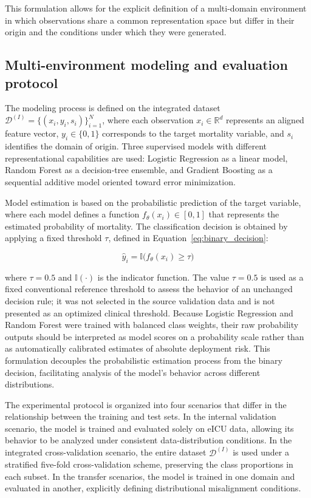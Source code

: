 \documentclass[utf8]{FrontiersinHarvard} %
\begin{document}
This formulation allows for the explicit definition of a multi-domain environment in which observations share a common representation space but differ in their origin and the conditions under which they were generated.

\subsection{Multi-environment modeling and evaluation protocol}

The modeling process is defined on the integrated dataset
$\mathcal{D}^{(I)} = \{(x_i, y_i, s_i)\}_{i=1}^{N}$,
where each observation $x_i \in \mathbb{R}^d$ represents an aligned feature vector, $y_i \in \{0,1\}$ corresponds to the target mortality variable, and $s_i$ identifies the domain of origin. Three supervised models with different representational capabilities are used: Logistic Regression as a linear model, Random Forest as a decision-tree ensemble, and Gradient Boosting as a sequential additive model oriented toward error minimization.

Model estimation is based on the probabilistic prediction of the target variable, where each model defines a function $f_{\theta}(x_i) \in [0,1]$ that represents the estimated probability of mortality. The classification decision is obtained by applying a fixed threshold $\tau$, defined in Equation~\ref{eq:binary_decision}:

\begin{equation}
	\hat{y}_i = \mathbb{I}\big(f_{\theta}(x_i) \geq \tau\big)
	\label{eq:binary_decision}
\end{equation}

where $\tau = 0.5$ and $\mathbb{I}(\cdot)$ is the indicator function. The value $\tau=0.5$ is used as a fixed conventional reference threshold to assess the behavior of an unchanged decision rule; it was not selected in the source validation data and is not presented as an optimized clinical threshold. Because Logistic Regression and Random Forest were trained with balanced class weights, their raw probability outputs should be interpreted as model scores on a probability scale rather than as automatically calibrated estimates of absolute deployment risk. This formulation decouples the probabilistic estimation process from the binary decision, facilitating analysis of the model's behavior across different distributions.

The experimental protocol is organized into four scenarios that differ in the relationship between the training and test sets. In the internal validation scenario, the model is trained and evaluated solely on eICU data, allowing its behavior to be analyzed under consistent data-distribution conditions. In the integrated cross-validation scenario, the entire dataset $\mathcal{D}^{(I)}$ is used under a stratified five-fold cross-validation scheme, preserving the class proportions in each subset. In the transfer scenarios, the model is trained in one domain and evaluated in another, explicitly defining distributional misalignment conditions.
\end{document}
